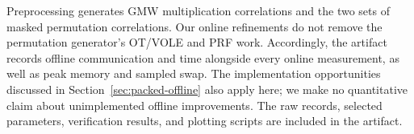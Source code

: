 Preprocessing generates GMW multiplication correlations and the two sets of
masked permutation correlations. Our online refinements do not remove the
permutation generator's OT/VOLE and PRF work. Accordingly, the artifact records
offline communication and time alongside every online measurement, as well as
peak memory and sampled swap. The implementation opportunities discussed in
Section~\ref{sec:packed-offline} also apply here; we make no quantitative claim
about unimplemented offline improvements. The raw records, selected parameters,
verification results, and plotting scripts are included in the artifact.
\clearpage
